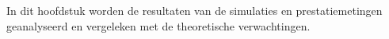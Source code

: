 
\chapter{}%
\label{ch:evaluatie}

In dit hoofdstuk worden de resultaten van de simulaties en prestatiemetingen geanalyseerd en vergeleken met de theoretische verwachtingen.
